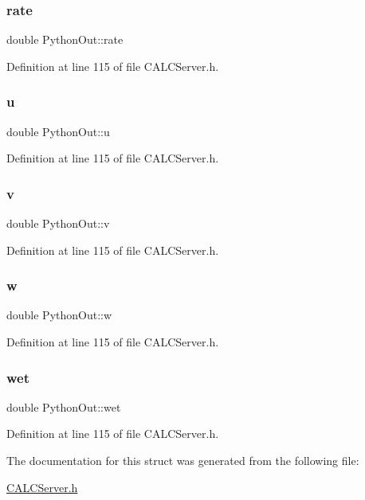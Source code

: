 \subsubsection{\texorpdfstring{rate}{rate}}
{\footnotesize\ttfamily double Python\+Out\+::rate}



Definition at line 115 of file C\+A\+L\+C\+Server.\+h.

\mbox{\label{struct_python_out_a95ee21e074791ce3832cc312e513c075}} 
\subsubsection{\texorpdfstring{u}{u}}
{\footnotesize\ttfamily double Python\+Out\+::u}



Definition at line 115 of file C\+A\+L\+C\+Server.\+h.

\mbox{\label{struct_python_out_a560f7c928e5104bbc64c242abf83bd26}} 
\subsubsection{\texorpdfstring{v}{v}}
{\footnotesize\ttfamily double Python\+Out\+::v}



Definition at line 115 of file C\+A\+L\+C\+Server.\+h.

\mbox{\label{struct_python_out_a67197a5152793612cf2c52ab0cfb5849}} 
\subsubsection{\texorpdfstring{w}{w}}
{\footnotesize\ttfamily double Python\+Out\+::w}



Definition at line 115 of file C\+A\+L\+C\+Server.\+h.

\mbox{\label{struct_python_out_a8b8576f7f276ee49f554c2944d321e8d}} 
\subsubsection{\texorpdfstring{wet}{wet}}
{\footnotesize\ttfamily double Python\+Out\+::wet}



Definition at line 115 of file C\+A\+L\+C\+Server.\+h.



The documentation for this struct was generated from the following file\+:\begin{DoxyCompactItemize}
\item 
\hyperlink{_c_a_l_c_server_8h}{C\+A\+L\+C\+Server.\+h}\end{DoxyCompactItemize}
